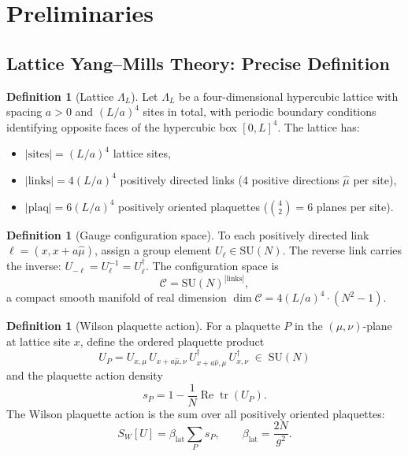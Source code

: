 \documentclass[12pt,a4paper]{article}
\theoremstyle{plain}
\theoremstyle{definition}
\newtheorem{definition}[theorem]{Definition}
\theoremstyle{remark}
\begin{document}
\section{Preliminaries}\label{sec:prelim}

\subsection{Lattice Yang--Mills Theory: Precise Definition}\label{sec:lattice}

\begin{definition}[Lattice $\Lambda_L$]\label{def:lattice}
Let $\Lambda_L$ be a four-dimensional hypercubic lattice with spacing $a>0$ and $(L/a)^4$ sites in total, with periodic boundary conditions identifying opposite faces of the hypercubic box $[0,L]^4$. The lattice has:
\begin{itemize}[nosep]
\item $|\mathrm{sites}| = (L/a)^4$ lattice sites,
\item $|\mathrm{links}| = 4(L/a)^4$ positively directed links (4 positive directions $\hat\mu$ per site),
\item $|\mathrm{plaq}| = 6(L/a)^4$ positively oriented plaquettes ($\binom{4}{2}=6$ planes per site).
\end{itemize}
\end{definition}

\begin{definition}[Gauge configuration space]\label{def:config}
To each positively directed link $\ell = (x, x+a\hat{\mu})$, assign a group element $U_\ell \in \mathrm{SU}(N)$. The reverse link carries the inverse: $U_{-\ell} = U_\ell^{-1} = U_\ell^\dagger$. The configuration space is
\begin{equation}\label{eq:config}
\mathcal{C} = \mathrm{SU}(N)^{|\mathrm{links}|},
\end{equation}
a compact smooth manifold of real dimension $\dim\mathcal{C} = 4(L/a)^4 \cdot (N^2-1)$.
\end{definition}

\begin{definition}[Wilson plaquette action]\label{def:wilson}
For a plaquette $P$ in the $(\mu,\nu)$-plane at lattice site $x$, define the ordered plaquette product
\begin{equation}\label{eq:UP}
U_P = U_{x,\mu}\, U_{x+a\hat\mu,\nu}\, U_{x+a\hat\nu,\mu}^\dagger\, U_{x,\nu}^\dagger \;\in\; \mathrm{SU}(N)
\end{equation}
and the plaquette action density
\begin{equation}\label{eq:sp}
s_P = 1 - \frac{1}{N}\operatorname{Re}\operatorname{tr}(U_P).
\end{equation}
The Wilson plaquette action is the sum over all positively oriented plaquettes:
\begin{equation}\label{eq:SW}
S_W[U] = \beta_{\mathrm{lat}}\sum_{P} s_P, \qquad \beta_{\mathrm{lat}} = \frac{2N}{g^2}.
\end{equation}
\end{definition}
\end{document}
